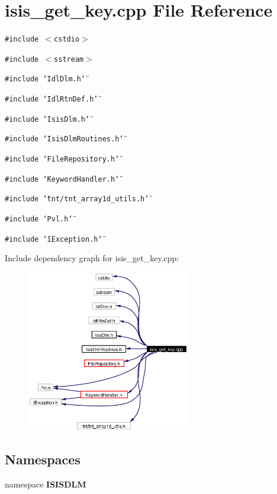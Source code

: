 \section{isis\_\-get\_\-key.cpp File Reference}
\label{isis__get__key_8cpp}
{\tt \#include $<$cstdio$>$}\par
{\tt \#include $<$sstream$>$}\par
{\tt \#include \char`\"{}Idl\-Dlm.h\char`\"{}}\par
{\tt \#include \char`\"{}Idl\-Rtn\-Def.h\char`\"{}}\par
{\tt \#include \char`\"{}Isis\-Dlm.h\char`\"{}}\par
{\tt \#include \char`\"{}Isis\-Dlm\-Routines.h\char`\"{}}\par
{\tt \#include \char`\"{}File\-Repository.h\char`\"{}}\par
{\tt \#include \char`\"{}Keyword\-Handler.h\char`\"{}}\par
{\tt \#include \char`\"{}tnt/tnt\_\-array1d\_\-utils.h\char`\"{}}\par
{\tt \#include \char`\"{}Pvl.h\char`\"{}}\par
{\tt \#include \char`\"{}i\-Exception.h\char`\"{}}\par


Include dependency graph for isis\_\-get\_\-key.cpp:\begin{figure}[H]
\begin{center}
\leavevmode
\includegraphics[width=202pt]{isis__get__key_8cpp__incl}
\end{center}
\end{figure}
\subsection*{Namespaces}
\begin{CompactItemize}
\item 
namespace {\bf ISISDLM}
\end{CompactItemize}

